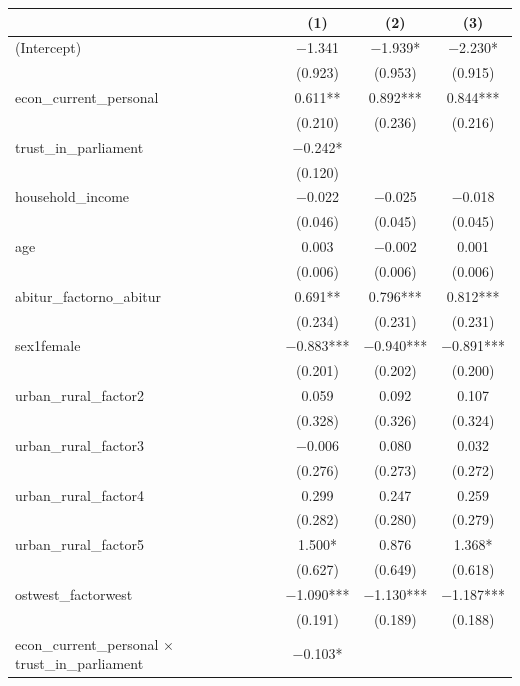 \documentclass[
]{article}
\begin{document}
\begin{table}
\centering
\begin{tabular}[t]{lccc}
\toprule
  & (1) & (2) & (3)\\
\midrule
(Intercept) & \num{-1.341} & \num{-1.939}* & \num{-2.230}*\\
 & (\num{0.923}) & (\num{0.953}) & (\num{0.915})\\
econ\_current\_personal & \num{0.611}** & \num{0.892}*** & \num{0.844}***\\
 & (\num{0.210}) & (\num{0.236}) & (\num{0.216})\\
trust\_in\_parliament & \num{-0.242}* &  & \\
 & (\num{0.120}) &  & \\
household\_income & \num{-0.022} & \num{-0.025} & \num{-0.018}\\
 & (\num{0.046}) & (\num{0.045}) & (\num{0.045})\\
age & \num{0.003} & \num{-0.002} & \num{0.001}\\
 & (\num{0.006}) & (\num{0.006}) & (\num{0.006})\\
abitur\_factorno\_abitur & \num{0.691}** & \num{0.796}*** & \num{0.812}***\\
 & (\num{0.234}) & (\num{0.231}) & (\num{0.231})\\
sex1female & \num{-0.883}*** & \num{-0.940}*** & \num{-0.891}***\\
 & (\num{0.201}) & (\num{0.202}) & (\num{0.200})\\
urban\_rural\_factor2 & \num{0.059} & \num{0.092} & \num{0.107}\\
 & (\num{0.328}) & (\num{0.326}) & (\num{0.324})\\
urban\_rural\_factor3 & \num{-0.006} & \num{0.080} & \num{0.032}\\
 & (\num{0.276}) & (\num{0.273}) & (\num{0.272})\\
urban\_rural\_factor4 & \num{0.299} & \num{0.247} & \num{0.259}\\
 & (\num{0.282}) & (\num{0.280}) & (\num{0.279})\\
urban\_rural\_factor5 & \num{1.500}* & \num{0.876} & \num{1.368}*\\
 & (\num{0.627}) & (\num{0.649}) & (\num{0.618})\\
ostwest\_factorwest & \num{-1.090}*** & \num{-1.130}*** & \num{-1.187}***\\
 & (\num{0.191}) & (\num{0.189}) & (\num{0.188})\\
econ\_current\_personal × trust\_in\_parliament & \num{-0.103}* &  & \\

\end{tabular}
\end{table}
\end{document}

